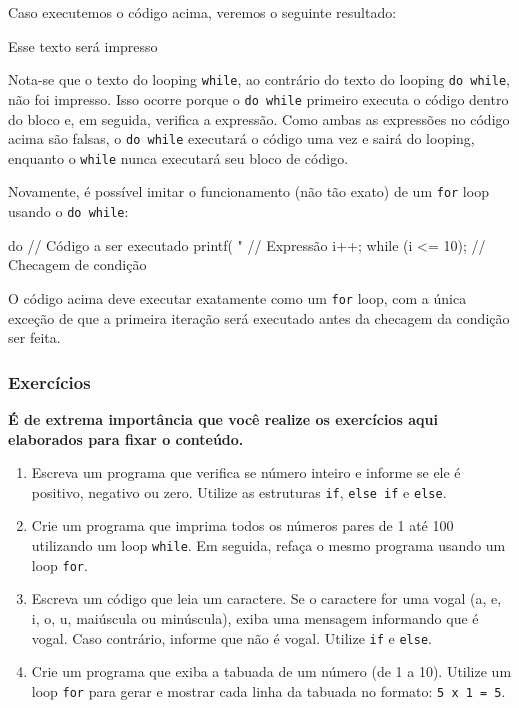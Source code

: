 Caso executemos o código acima, veremos o seguinte resultado:

\begin{textbox}
    Esse texto será impresso
\end{textbox}

Nota-se que o texto do looping \texttt{while}, ao contrário do texto do looping 
\texttt{do while}, não foi impresso. Isso ocorre porque o \texttt{do while} 
primeiro executa o código dentro do bloco e, em seguida, verifica a expressão. 
Como ambas as expressões no código acima são falsas, o \texttt{do while} 
executará o código uma vez e sairá do looping, enquanto o \texttt{while} 
nunca executará seu bloco de código.

Novamente, é possível imitar o funcionamento (não tão exato) de um \texttt{for} 
loop usando o \texttt{do while}:

\begin{excode}
    do
    {
        //  Código a ser executado
        printf( "%
        // Expressão
        i++;
    }  while (i <= 10); // Checagem de condição 
\end{excode}

O código acima deve executar exatamente como um \texttt{for} loop, com a única exceção 
de que a primeira iteração será executado antes da checagem da condição ser feita.

\subsubsection{Exercícios}

\textbf{É de extrema importância que você realize os exercícios aqui elaborados 
para fixar o conteúdo.}

\begin{enumerate}
    \item {Escreva um programa que verifica se número inteiro e informe se ele é 
        positivo, negativo ou zero. Utilize as estruturas \texttt{if}, 
        \texttt{else if} e \texttt{else}.}
    \item {Crie um programa que imprima todos os números pares de 1 até 100 
        utilizando um loop \texttt{while}. Em seguida, refaça o mesmo programa 
        usando um loop \texttt{for}.}
    \item {Escreva um código que leia um caractere. Se o caractere for uma vogal 
        (a, e, i, o, u, maiúscula ou minúscula), exiba uma mensagem informando 
        que é vogal. Caso contrário, informe que não é vogal. Utilize \texttt{if} 
        e \texttt{else}.}
    \item {Crie um programa que exiba a tabuada de um número (de 1 a 10). Utilize 
        um loop \texttt{for} para gerar e mostrar cada linha da tabuada no formato: 
        \texttt{5 x 1 = 5}.}
\end{enumerate}
